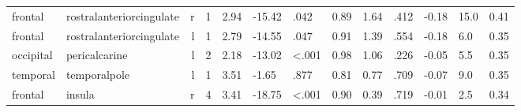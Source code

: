 \documentclass{article}
\begin{document}
\begin{longtable}{llrR{1.5cm}R{1cm}R{1.3cm}R{1cm}R{1cm}R{1.3cm}R{1cm}R{1.8cm}R{1.3cm}R{1.8cm}}
   frontal &  rostralanteriorcingulate &    r &            1 &                  2.94 &           -15.42 &               .042 &                               0.89 &                          1.64 &                            .412 & -0.18 &   15.0 &      0.41 \\
   frontal &  rostralanteriorcingulate &    l &            1 &                  2.79 &           -14.55 &               .047 &                               0.91 &                          1.39 &                            .554 & -0.18 &    6.0 &      0.35 \\
 occipital &             pericalcarine &    l &            2 &                  2.18 &           -13.02 &      \textless.001 &                               0.98 &                          1.06 &                            .226 & -0.05 &    5.5 &      0.35 \\
  temporal &              temporalpole &    l &            1 &                  3.51 &            -1.65 &               .877 &                               0.81 &                          0.77 &                            .709 & -0.07 &    9.0 &      0.35 \\
   frontal &                    insula &    r &            4 &                  3.41 &           -18.75 &      \textless.001 &                               0.90 &                          0.39 &                            .719 & -0.01 &    2.5 &      0.34 \\
\end{longtable}
\end{document}
